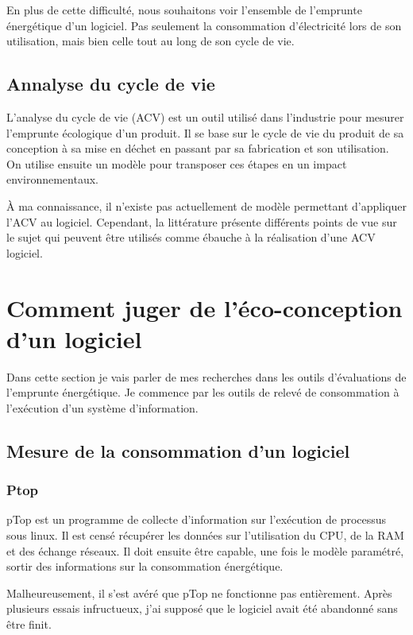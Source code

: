 \documentclass[a4paper, 11pt]{report}
\begin{document}
En plus de cette difficulté, nous souhaitons voir l'ensemble de l'emprunte énergétique d'un logiciel. Pas seulement la consommation d'électricité lors de son utilisation, mais bien celle tout au long de son cycle de vie.

\subsection{Annalyse du cycle de vie}
L'analyse du cycle de vie (ACV) est un outil utilisé dans l'industrie pour mesurer l'emprunte écologique d'un produit. Il se base sur le cycle de vie du produit de sa conception à sa mise en déchet en passant par sa fabrication et son utilisation. On utilise ensuite un modèle pour transposer ces étapes en un impact environnementaux.

À ma connaissance, il n'existe pas actuellement de modèle permettant d'appliquer l'ACV au logiciel. Cependant, la littérature présente différents points de vue sur le sujet qui peuvent être utilisés comme ébauche à la réalisation d'une ACV logiciel.

\section{Comment juger de l'éco-conception d'un logiciel}
Dans cette section je vais parler de mes recherches dans les outils d'évaluations de l'emprunte énergétique. Je commence par les outils de relevé de consommation à l'exécution d'un système d'information.

\subsection{Mesure de la consommation d'un logiciel}
\subsubsection{Ptop}
pTop est un programme de collecte d’information sur l'exécution de processus sous linux. Il est censé récupérer les données sur l'utilisation du CPU, de la RAM et des échange réseaux. Il doit ensuite être capable, une fois le modèle paramétré, sortir des informations sur la consommation énergétique.

Malheureusement, il s'est avéré que pTop ne fonctionne pas entièrement. Après plusieurs essais infructueux, j'ai supposé que le logiciel avait été abandonné sans être finit.
\end{document}
